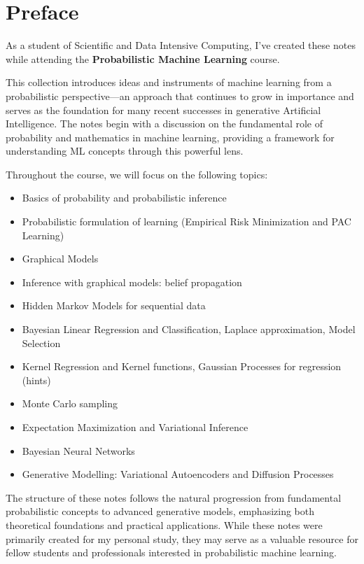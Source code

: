 \chapter*{Preface}

As a student of Scientific and Data Intensive Computing, I've created these notes while attending the \textbf{Probabilistic Machine Learning} course.

\vspace{1em}

This collection introduces ideas and instruments of machine learning from a probabilistic perspective—an approach that continues to grow in importance and serves as the foundation for many recent successes in generative Artificial Intelligence. The notes begin with a discussion on the fundamental role of probability and mathematics in machine learning, providing a framework for understanding ML concepts through this powerful lens.

\vspace{1em}

Throughout the course, we will focus on the following topics:

\begin{itemize}
    \item Basics of probability and probabilistic inference
    \item Probabilistic formulation of learning (Empirical Risk Minimization and PAC Learning)
    \item Graphical Models
    \item Inference with graphical models: belief propagation
    \item Hidden Markov Models for sequential data
    \item Bayesian Linear Regression and Classification, Laplace approximation, Model Selection
    \item Kernel Regression and Kernel functions, Gaussian Processes for regression (hints)
    \item Monte Carlo sampling
    \item Expectation Maximization and Variational Inference
    \item Bayesian Neural Networks
    \item Generative Modelling: Variational Autoencoders and Diffusion Processes
\end{itemize}

\vspace{1em}

The structure of these notes follows the natural progression from fundamental probabilistic concepts to advanced generative models, emphasizing both theoretical foundations and practical applications. While these notes were primarily created for my personal study, they may serve as a valuable resource for fellow students and professionals interested in probabilistic machine learning.